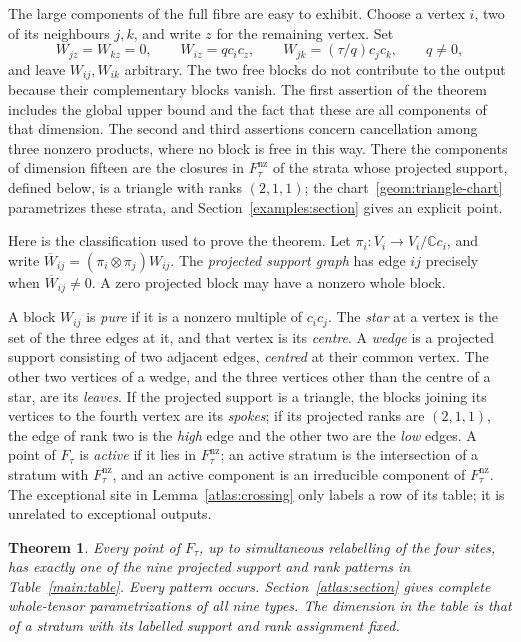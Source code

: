 \documentclass[11pt,letterpaper]{article}
\newcommand{\C}{\mathbb C}
\newcommand{\Ftau}{F_\tau}
\newcommand{\Fact}{F_\tau^{\mathrm{nz}}}
\newtheorem{theorem}{Theorem}[section]
\theoremstyle{definition}
\begin{document}
The large components of the full fibre are easy to exhibit. Choose a vertex
\(i\), two of its neighbours \(j,k\), and write \(z\) for the remaining vertex.
Set
\begin{equation}\label{main:large}
 W_{jz}=W_{kz}=0,\qquad
 W_{iz}=q c_ic_z,\qquad W_{jk}=(\tau/q)c_jc_k,
 \qquad q\ne0,
\end{equation}
and leave \(W_{ij},W_{ik}\) arbitrary. The two free blocks do not contribute
to the output because their complementary blocks vanish. The first assertion
of the theorem includes the global upper bound and the fact that these are
all components of that dimension. The second and third assertions concern
cancellation among three nonzero products, where no block is free in this
way. There the components of dimension fifteen are the closures in
\(\Fact\) of the strata whose projected support, defined below, is a
triangle with ranks \((2,1,1)\); the
chart~\eqref{geom:triangle-chart} parametrizes these strata, and
Section~\ref{examples:section} gives an explicit point.

Here is the classification used to prove the theorem. Let
\(\pi_i:V_i\to V_i/\C c_i\), and write
\(\overline W_{ij}=(\pi_i\otimes\pi_j)W_{ij}\).
The \emph{projected support graph} has edge \(ij\) precisely when
\(\overline W_{ij}\ne0\). A zero projected block may have a nonzero whole
block.

A block \(W_{ij}\) is \emph{pure} if it is a nonzero multiple of
\(c_ic_j\). The \emph{star} at a vertex is the set of the three edges at
it, and that vertex is its \emph{centre}. A \emph{wedge} is a projected
support consisting of two adjacent edges, \emph{centred} at their common
vertex. The other two vertices of a wedge, and the three vertices other
than the centre of a star, are its \emph{leaves}. If the projected support
is a triangle, the blocks joining its vertices to the fourth vertex are its
\emph{spokes}; if its projected ranks are \((2,1,1)\), the edge of rank two
is the \emph{high} edge and the other two are the \emph{low} edges. A point
of \(\Ftau\) is \emph{active} if it lies in \(\Fact\); an active stratum is
the intersection of a stratum with \(\Fact\), and an active component is an
irreducible component of \(\Fact\). The exceptional site in
Lemma~\ref{atlas:crossing} only labels a row of its table; it is unrelated
to exceptional outputs.

\begin{theorem}\label{main:atlas}
Every point of \(\Ftau\), up to simultaneous relabelling of the four sites,
has exactly one of the nine projected support and rank patterns in
Table~\ref{main:table}. Every pattern occurs. Section~\ref{atlas:section}
gives complete whole-tensor parametrizations of all nine types.
The dimension in the table is that of a stratum with its labelled support
and rank assignment fixed.
\end{theorem}
\end{document}
